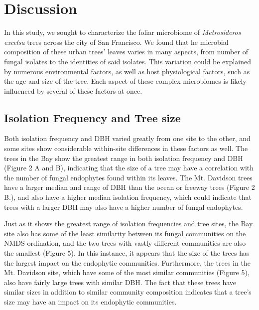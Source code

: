 \documentclass[fleqn,10pt,lineno]{wlpeerj} %
\begin{document}
\hypertarget{discussion}{%
\section*{Discussion}\label{discussion}}

In this study, we sought to characterize the foliar microbiome of \emph{Metrosideros excelsa} trees across the city of San Francisco. We found that he microbial composition of these urban trees' leaves varies in many aspects, from number of fungal isolates to the identities of said isolates. This variation could be explained by numerous environmental factors, as well as host physiological factors, such as the age and size of the tree. Each aspect of these complex microbiomes is likely influenced by several of these factors at once.

\hypertarget{isolation-frequency-and-tree-size}{%
\subsection*{Isolation Frequency and Tree size}\label{isolation-frequency-and-tree-size}}

Both isolation frequency and DBH varied greatly from one site to the other, and some sites show considerable within-site differences in these factors as well. The trees in the Bay show the greatest range in both isolation frequency and DBH (Figure 2 A and B), indicating that the size of a tree may have a correlation with the number of fungal endophytes found within its leaves. The Mt. Davidson trees have a larger median and range of DBH than the ocean or freeway trees (Figure 2 B.), and also have a higher median isolation frequency, which could indicate that trees with a larger DBH may also have a higher number of fungal endophytes.

Just as it shows the greatest range of isolation frequencies and tree sites, the Bay site also has some of the least similarity between its fungal communities on the NMDS ordination, and the two trees with vastly different communities are also the smallest (Figure 5). In this instance, it appears that the size of the trees has the largest impact on the endophytic communities. Furthermore, the trees in the Mt. Davidson site, which have some of the most similar communities (Figure 5), also have fairly large trees with similar DBH. The fact that these trees have similar sizes in addition to similar community composition indicates that a tree's size may have an impact on its endophytic communities.
\end{document}
